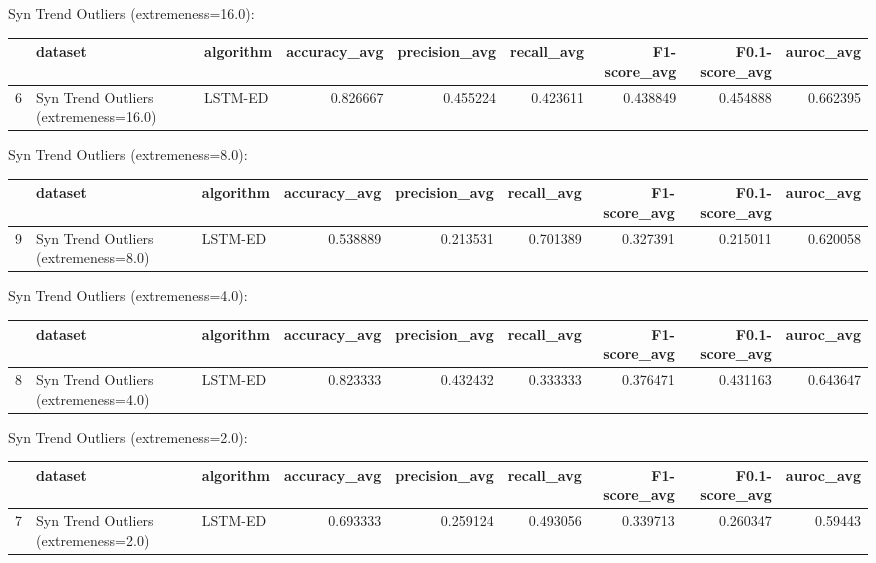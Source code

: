 Syn Trend Outliers (extremeness=16.0):

\begin{tabular}{rllrrrrrr}
\hline
    & dataset                               & algorithm   &   accuracy\_avg &   precision\_avg &   recall\_avg &   F1-score\_avg &   F0.1-score\_avg &   auroc\_avg \\
\hline
  6 & Syn Trend Outliers (extremeness=16.0) & LSTM-ED     &       0.826667 &        0.455224 &     0.423611 &       0.438849 &         0.454888 &    0.662395 \\
\hline
\end{tabular}

Syn Trend Outliers (extremeness=8.0):

\begin{tabular}{rllrrrrrr}
\hline
    & dataset                              & algorithm   &   accuracy\_avg &   precision\_avg &   recall\_avg &   F1-score\_avg &   F0.1-score\_avg &   auroc\_avg \\
\hline
  9 & Syn Trend Outliers (extremeness=8.0) & LSTM-ED     &       0.538889 &        0.213531 &     0.701389 &       0.327391 &         0.215011 &    0.620058 \\
\hline
\end{tabular}

Syn Trend Outliers (extremeness=4.0):

\begin{tabular}{rllrrrrrr}
\hline
    & dataset                              & algorithm   &   accuracy\_avg &   precision\_avg &   recall\_avg &   F1-score\_avg &   F0.1-score\_avg &   auroc\_avg \\
\hline
  8 & Syn Trend Outliers (extremeness=4.0) & LSTM-ED     &       0.823333 &        0.432432 &     0.333333 &       0.376471 &         0.431163 &    0.643647 \\
\hline
\end{tabular}

Syn Trend Outliers (extremeness=2.0):

\begin{tabular}{rllrrrrrr}
\hline
    & dataset                              & algorithm   &   accuracy\_avg &   precision\_avg &   recall\_avg &   F1-score\_avg &   F0.1-score\_avg &   auroc\_avg \\
\hline
  7 & Syn Trend Outliers (extremeness=2.0) & LSTM-ED     &       0.693333 &        0.259124 &     0.493056 &       0.339713 &         0.260347 &     0.59443 \\
\hline
\end{tabular}

